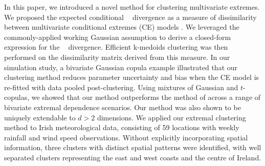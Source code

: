\documentclass[12pt,compact]{article}
\newcommand{\JSGa}{\mathop{\mathrm{JS}^{\mathrm{G}_{\lambda}}}\nolimits}
\begin{document}
In this paper, we introduced a novel method for clustering multivariate extremes. %
We proposed the expected conditional $\JSGa{}$ divergence \citep{Nielsen2019} as a measure of dissimilarity between multivariate conditional extremes (CE) models \citep{Heffernan2004}.
We leveraged the commonly-applied working Gaussian assumption to derive a closed-form expression for the $\JSGa{}$ divergence.
Efficient k-medoids clustering was then performed on the dissimilarity matrix derived from this measure. 
In our simulation study, a bivariate Gaussian copula example illustrated that our clustering method reduces parameter uncertainty and bias when the CE model is re-fitted with data pooled post-clustering.
Using mixtures of Gaussian and $t$-copulas, we showed that our method outperforms the method of \citet{Vignotto2021} across a range of bivariate extremal dependence scenarios.
Our method was also shown to be uniquely extendable to $d > 2$ dimensions. 
We applied our extremal clustering method to Irish meteorological data, consisting of 59 locations with weekly rainfall and wind speed observations.
Without explicitly incorporating spatial information, three clusters with distinct spatial patterns were identified, with well separated clusters representing the east and west coasts and the centre of Ireland.
\end{document}

